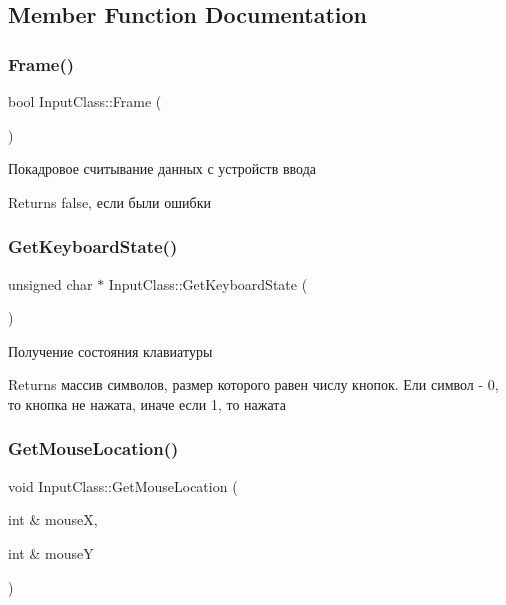 \subsection{Member Function Documentation}
\mbox{\label{class_input_class_a5c5cec23229834dc6627e211bb1f59cb}} 
\subsubsection{\texorpdfstring{Frame()}{Frame()}}
{\footnotesize\ttfamily bool Input\+Class\+::\+Frame (\begin{DoxyParamCaption}{ }\end{DoxyParamCaption})}



Покадровое считывание данных с устройств ввода 

\begin{DoxyReturn}{Returns}
false, если были ошибки 
\end{DoxyReturn}
\mbox{\label{class_input_class_ae197c072cb2056b75793f9d21be97787}} 
\subsubsection{\texorpdfstring{Get\+Keyboard\+State()}{GetKeyboardState()}}
{\footnotesize\ttfamily unsigned char $\ast$ Input\+Class\+::\+Get\+Keyboard\+State (\begin{DoxyParamCaption}{ }\end{DoxyParamCaption})}



Получение состояния клавиатуры 

\begin{DoxyReturn}{Returns}
массив символов, размер которого равен числу кнопок. Ели символ -\/ 0, то кнопка не нажата, иначе если 1, то нажата 
\end{DoxyReturn}
\mbox{\label{class_input_class_a447bd4da31fb87f8ce2dc964449a3566}} 
\subsubsection{\texorpdfstring{Get\+Mouse\+Location()}{GetMouseLocation()}}
{\footnotesize\ttfamily void Input\+Class\+::\+Get\+Mouse\+Location (\begin{DoxyParamCaption}\item[{int \&}]{mouseX,  }\item[{int \&}]{mouseY }\end{DoxyParamCaption})}



